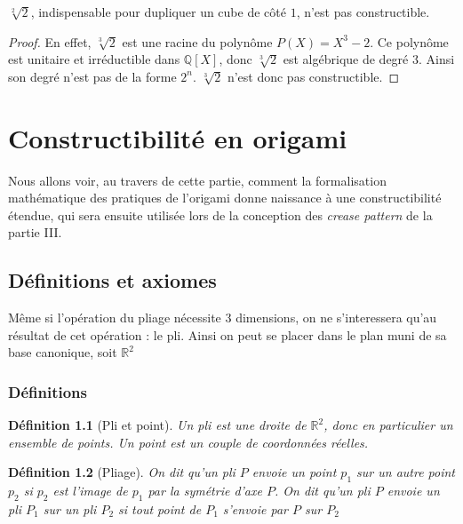 \documentclass[a4paper,12pt,french,draft]{report}
\newtheorem{definition}{Définition}[section]
\begin{document}
             
             \begin{proposition}
             
             $\sqrt[2]{2}$, indispensable pour dupliquer un cube de côté $1$, n'est pas constructible.
             
             \end{proposition}
             
			\begin{proof}
			En effet, 
				\(\sqrt[3]{2}\) est une racine du polynôme 
				\(P(X)=X^{3}-2\). Ce polynôme est unitaire et 
				irréductible dans \(\mathbb{Q}[X]\), donc \(\sqrt[3]{2}\) 
				est algébrique de degré 3. Ainsi son degré n'est pas de 
				la forme \(2^{n}\). \(\sqrt[3]{2}\) n'est donc pas 
				constructible.

			\end{proof}
		





\chapter{Constructibilité en origami}
	Nous allons voir, au travers de cette partie, comment la formalisation mathématique des pratiques de l'origami donne naissance à une constructibilité étendue, qui sera ensuite utilisée lors de la conception des \emph{crease pattern} de la partie III.

	\section{Définitions et axiomes}
		Même si l'opération du pliage nécessite 3 dimensions, on ne s'interessera qu'au résultat de cet opération : le pli. Ainsi on peut se placer dans le plan muni de sa base canonique, soit $\mathbb{R}^{2}$
	\subsection{Définitions}
		\begin{definition}[Pli et point]
			Un \emph{pli} est une droite de $\mathbb{R}^{2}$, donc en particulier un ensemble de points. Un \emph{point} est un couple de coordonnées réelles.
		\end{definition}
		\begin{definition}[Pliage]
			On dit qu'un pli $P$ \emph{envoie} un point $p_{1}$ sur un autre point $p_{2}$ si $p_{2}$ est l'image de $p_{1}$ par la symétrie d'axe $P$. On dit qu'un pli $P$ \emph{envoie} un pli $P_{1}$ sur un pli $P_{2}$ si tout point de $P_{1}$ s'envoie par $P$ sur $P_{2}$
		\end{definition}
		
\end{document}
